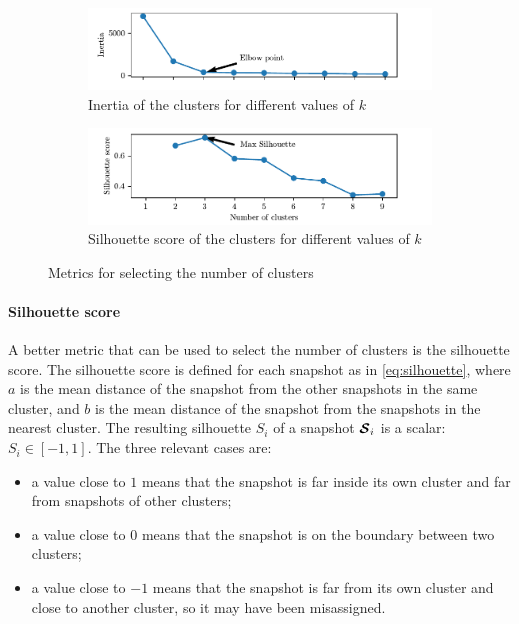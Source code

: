 \begin{figure}
  \begin{subfigure}{\textwidth}
    \includegraphics[width=\textwidth]{images/Kmeans_inertia.pdf}
    \caption{Inertia of the clusters for different values of $k$}
    \label{fig:kmeans_inertia}
  \end{subfigure}
  \begin{subfigure}{\textwidth}
    \includegraphics[width=\textwidth]{images/Kmeans_silhouette.pdf}
    \caption{Silhouette score of the clusters for different values of $k$}
    \label{fig:kmeans_silhouette}
  \end{subfigure}
  \label{fig:kmeans_metrics}
  \caption{Metrics for selecting the number of clusters}
\end{figure}

\paragraph*{Silhouette score}
A better metric that can be used to select the number of clusters is the silhouette score.
The silhouette score is defined for each snapshot as in \autoref{eq:silhouette}, where $a$ is the mean distance of the snapshot from the other snapshots in the same cluster, and $b$ is the mean distance of the snapshot from the snapshots in the nearest cluster. The resulting silhouette $S_i$ of a snapshot $\bm{\mathcal{S}}_i$ is a scalar: $S_i \in [-1,1]$.
The three relevant cases are:
\begin{itemize}
  \item a value close to $1$ means that the snapshot is far inside its own cluster and far from snapshots of other clusters;
  \item a value close to $0$ means that the snapshot is on the boundary between two clusters;
  \item a value close to $-1$ means that the snapshot is far from its own cluster and close to another cluster, so it may have been misassigned.
\end{itemize}

